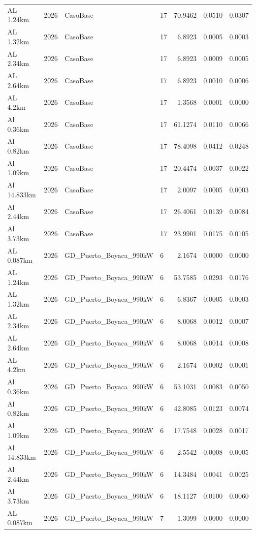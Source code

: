\documentclass[11pt,a4paper]{article}
\begin{document}
\begin{longtable}{llllrrr}
AL 1.24km & 2026 & CasoBase & 17 & 70.9462 & 0.0510 & 0.0307 \\
AL 1.32km & 2026 & CasoBase & 17 & 6.8923 & 0.0005 & 0.0003 \\
AL 2.34km & 2026 & CasoBase & 17 & 6.8923 & 0.0009 & 0.0005 \\
AL 2.64km & 2026 & CasoBase & 17 & 6.8923 & 0.0010 & 0.0006 \\
AL 4.2km & 2026 & CasoBase & 17 & 1.3568 & 0.0001 & 0.0000 \\
Al 0.36km & 2026 & CasoBase & 17 & 61.1274 & 0.0110 & 0.0066 \\
Al 0.82km & 2026 & CasoBase & 17 & 78.4098 & 0.0412 & 0.0248 \\
Al 1.09km & 2026 & CasoBase & 17 & 20.4474 & 0.0037 & 0.0022 \\
Al 14.833km & 2026 & CasoBase & 17 & 2.0097 & 0.0005 & 0.0003 \\
Al 2.44km & 2026 & CasoBase & 17 & 26.4061 & 0.0139 & 0.0084 \\
Al 3.73km & 2026 & CasoBase & 17 & 23.9901 & 0.0175 & 0.0105 \\
AL 0.087km & 2026 & GD\_Puerto\_Boyaca\_990kW & 6 & 2.1674 & 0.0000 & 0.0000 \\
AL 1.24km & 2026 & GD\_Puerto\_Boyaca\_990kW & 6 & 53.7585 & 0.0293 & 0.0176 \\
AL 1.32km & 2026 & GD\_Puerto\_Boyaca\_990kW & 6 & 6.8367 & 0.0005 & 0.0003 \\
AL 2.34km & 2026 & GD\_Puerto\_Boyaca\_990kW & 6 & 8.0068 & 0.0012 & 0.0007 \\
AL 2.64km & 2026 & GD\_Puerto\_Boyaca\_990kW & 6 & 8.0068 & 0.0014 & 0.0008 \\
AL 4.2km & 2026 & GD\_Puerto\_Boyaca\_990kW & 6 & 2.1674 & 0.0002 & 0.0001 \\
Al 0.36km & 2026 & GD\_Puerto\_Boyaca\_990kW & 6 & 53.1031 & 0.0083 & 0.0050 \\
Al 0.82km & 2026 & GD\_Puerto\_Boyaca\_990kW & 6 & 42.8085 & 0.0123 & 0.0074 \\
Al 1.09km & 2026 & GD\_Puerto\_Boyaca\_990kW & 6 & 17.7548 & 0.0028 & 0.0017 \\
Al 14.833km & 2026 & GD\_Puerto\_Boyaca\_990kW & 6 & 2.5542 & 0.0008 & 0.0005 \\
Al 2.44km & 2026 & GD\_Puerto\_Boyaca\_990kW & 6 & 14.3484 & 0.0041 & 0.0025 \\
Al 3.73km & 2026 & GD\_Puerto\_Boyaca\_990kW & 6 & 18.1127 & 0.0100 & 0.0060 \\
AL 0.087km & 2026 & GD\_Puerto\_Boyaca\_990kW & 7 & 1.3099 & 0.0000 & 0.0000 \\

\end{longtable}
\end{document}

